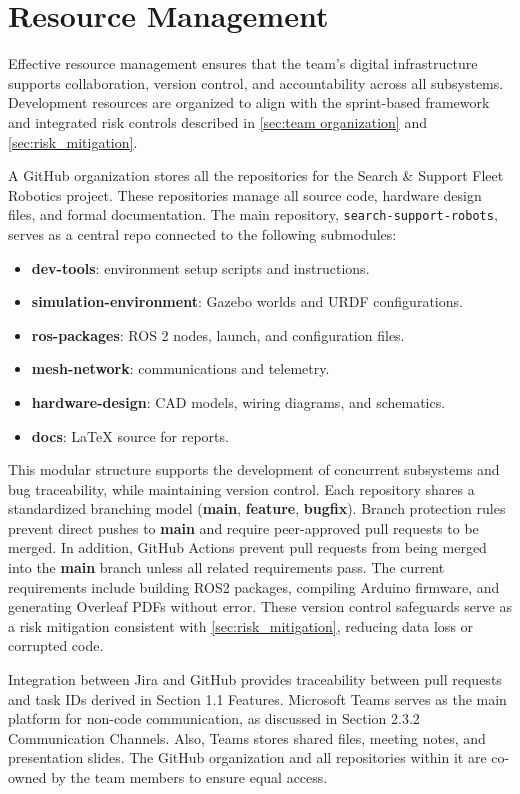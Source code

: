 \section{Resource Management}
\label{sec:resource management}

Effective resource management ensures that the team’s digital infrastructure supports collaboration, version control, and accountability across all subsystems. Development resources are organized to align with the sprint-based framework and integrated risk controls described in \autoref{sec:team organization} and \autoref{sec:risk_mitigation}.

A GitHub organization stores all the repositories for the Search \& Support Fleet Robotics project. These repositories manage all source code, hardware design files, and formal documentation. The main repository, \texttt{search-support-robots}, serves as a central repo connected to the following submodules:

\begin{itemize}
    \item \textbf{dev-tools}: environment setup scripts and instructions.
    \item \textbf{simulation-environment}: Gazebo worlds and URDF configurations.
    \item \textbf{ros-packages}: ROS 2 nodes, launch, and configuration files.
    \item \textbf{mesh-network}: communications and telemetry.
    \item \textbf{hardware-design}: CAD models, wiring diagrams, and schematics.
    \item \textbf{docs}: LaTeX source for reports.
\end{itemize}

This modular structure supports the development of concurrent subsystems and bug traceability, while maintaining version control. Each repository shares a standardized branching model (\textbf{main}, \textbf{feature}, \textbf{bugfix}). Branch protection rules prevent direct pushes to \textbf{main} and require peer-approved pull requests to be merged. In addition, GitHub Actions prevent pull requests from being merged into the \textbf{main} branch unless all related requirements pass. The current requirements include building ROS2 packages, compiling Arduino firmware, and generating Overleaf PDFs without error. These version control safeguards serve as a risk mitigation consistent with \autoref{sec:risk_mitigation}, reducing data loss or corrupted code.

Integration between Jira and GitHub provides traceability between pull requests and task IDs derived in Section 1.1 Features. Microsoft Teams serves as the main platform for non-code communication, as discussed in Section 2.3.2 Communication Channels. Also, Teams stores shared files, meeting notes, and presentation slides. The GitHub organization and all repositories within it are co-owned by the team members to ensure equal access.